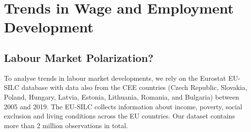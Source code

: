 \documentclass[11pt]{article}
\begin{document}





\section{Trends in Wage and Employment Development}
\subsection{Labour Market Polarization?}\label{wage_analysis}
To analyse trends in labour market developments, we rely on the Eurostat EU-SILC database with data also from the CEE countries (Czech Republic, Slovakia, Poland, Hungary, Latvia, Estonia, Lithuania, Romania, and Bulgaria) between 2005 and 2019. The EU-SILC collects information about income, poverty, social exclusion and living conditions across the EU countries. Our dataset contains more than 2 million observations in total.
\end{document}
